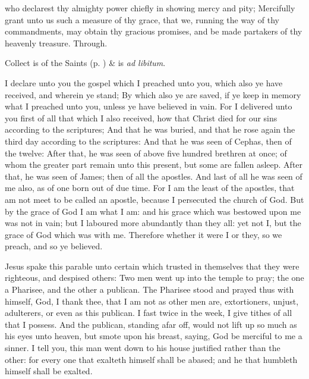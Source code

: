 \collect
{} who declarest thy almighty power chiefly in showing mercy and pity; Mercifully grant unto us such a measure of thy grace, that we, running the way of thy commandments, may obtain thy gracious promises, and be made partakers of thy heavenly treasure. Through.
\begin{rubric}
     Collect is of the Saints (p. \pageref{SPSaints}) \&  is \emph{ad libitum}.
\end{rubric}

 I declare unto you the gospel which I preached unto you, which also ye have received, and wherein ye stand; By which also ye are saved, if ye keep in memory what I preached unto you, unless ye have believed in vain. For I delivered unto you first of all that which I also received, how that Christ died for our sins according to the scriptures; And that he was buried, and that he rose again the third day according to the scriptures: And that he was seen of Cephas, then of the twelve: After that, he was seen of above five hundred brethren at once; of whom the greater part remain unto this present, but some are fallen asleep. After that, he was seen of James; then of all the apostles. And last of all he was seen of me also, as of one born out of due time. For I am the least of the apostles, that am not meet to be called an apostle, because I persecuted the church of God. But by the grace of God I am what I am: and his grace which was bestowed upon me was not in vain; but I laboured more abundantly than they all: yet not I, but the grace of God which was with me. Therefore whether it were I or they, so we preach, and so ye believed.


 Jesus spake this parable unto certain which trusted in themselves that they were righteous, and despised others: Two men went up into the temple to pray; the one a Pharisee, and the other a publican. The Pharisee stood and prayed thus with himself, God, I thank thee, that I am not as other men are, extortioners, unjust, adulterers, or even as this publican. I fast twice in the week, I give tithes of all that I possess. And the publican, standing afar off, would not lift up so much as his eyes unto heaven, but smote upon his breast, saying, God be merciful to me a sinner. I tell you, this man went down to his house justified rather than the other: for every one that exalteth himself shall be abased; and he that humbleth himself shall be exalted.

